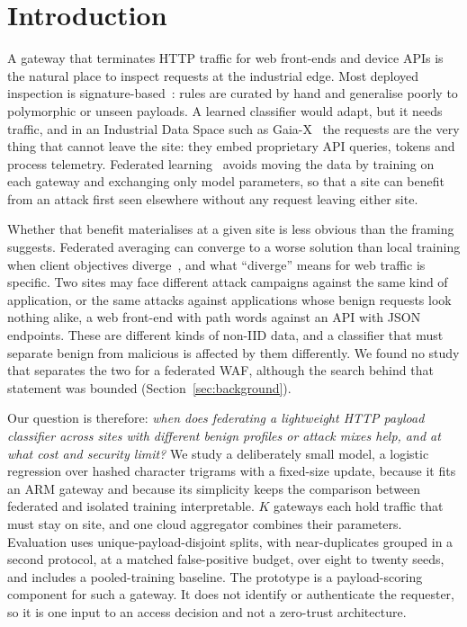 \section{Introduction}
\label{sec:intro}

A gateway that terminates HTTP traffic for web front-ends and device APIs is the natural place to inspect requests at the industrial edge. Most deployed inspection is signature-based~\cite{modsecurity,roesch1999,suricata}: rules are curated by hand and generalise poorly to polymorphic or unseen payloads. A learned classifier would adapt, but it needs traffic, and in an Industrial Data Space such as Gaia-X~\cite{gaiax2021} the requests are the very thing that cannot leave the site: they embed proprietary API queries, tokens and process telemetry. Federated learning~\cite{mcmahan2017} avoids moving the data by training on each gateway and exchanging only model parameters, so that a site can benefit from an attack first seen elsewhere without any request leaving either site.

Whether that benefit materialises at a given site is less obvious than the framing suggests. Federated averaging can converge to a worse solution than local training when client objectives diverge~\cite{li2020convergence}, and what ``diverge'' means for web traffic is specific. Two sites may face different attack campaigns against the same kind of application, or the same attacks against applications whose benign requests look nothing alike, a web front-end with path words against an API with JSON endpoints. These are different kinds of non-IID data, and a classifier that must separate benign from malicious is affected by them differently. We found no study that separates the two for a federated WAF, although the search behind that statement was bounded (Section~\ref{sec:background}).

Our question is therefore: \emph{when does federating a lightweight HTTP payload classifier across sites with different benign profiles or attack mixes help, and at what cost and security limit?} We study a deliberately small model, a logistic regression over hashed character trigrams with a fixed-size update, because it fits an ARM gateway and because its simplicity keeps the comparison between federated and isolated training interpretable. $K$ gateways each hold traffic that must stay on site, and one cloud aggregator combines their parameters. Evaluation uses unique-payload-disjoint splits, with near-duplicates grouped in a second protocol, at a matched false-positive budget, over eight to twenty seeds, and includes a pooled-training baseline. The prototype is a payload-scoring component for such a gateway. It does not identify or authenticate the requester, so it is one input to an access decision and not a zero-trust architecture.

